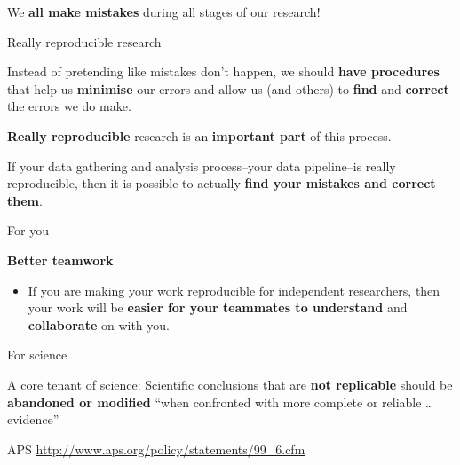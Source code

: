 \documentclass[10pt]{beamer}
\begin{document}
\begin{frame}

    \begin{center}
        {\LARGE{We \textbf{all make mistakes} during all stages of our research!}}

    \end{center}

\end{frame}

\begin{frame}{Really reproducible research}

    Instead of pretending like mistakes don't happen, we should \textbf{have procedures} that help us \textbf{minimise} our errors and allow us (and others) to \textbf{find} and \textbf{correct} the errors we do make.

    \vspace{1cm}

    \textbf{Really reproducible} research is an \textbf{important part} of this process.

\end{frame}

\begin{frame}

    If your data gathering and analysis process--your \alert{data pipeline}--is really reproducible, then it is possible to actually \textbf{find your mistakes and correct them}.

\end{frame}

\begin{frame}{For you}

    \textbf{Better teamwork}

    \begin{itemize}

            \item If you are making your work reproducible for independent researchers, then your work will be \textbf{easier for your teammates to understand} and \textbf{collaborate} on with you.

    \end{itemize}

\end{frame}

\begin{frame}{For science}

    A \alert{core tenant} of science: Scientific conclusions that are \textbf{not replicable} should be \textbf{abandoned or modified} ``when confronted with more complete or reliable \ldots evidence''

{\tiny{APS \url{http://www.aps.org/policy/statements/99_6.cfm}}}

\end{frame}
\end{document}
